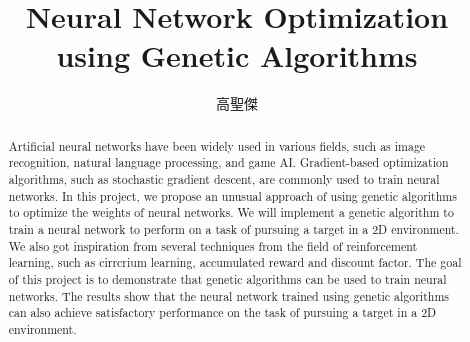 \documentclass[sigconf]{acmart}
\begin{document}
\title{Neural Network Optimization using Genetic Algorithms}

\begin{CJK}{UTF8}{bkai}
  \author{高聖傑}

\renewcommand{\shortauthors}{Kao, Sheng-Jie}

\begin{abstract}
Artificial neural networks have been widely used in various fields, such as image recognition, natural language processing, and game AI. Gradient-based optimization algorithms, such as stochastic gradient descent, are commonly used to train neural networks. In this project, we propose an unusual approach of using genetic algorithms to optimize the weights of neural networks. We will implement a genetic algorithm to train a neural network to perform on a task of pursuing a target in a 2D environment. We also got inspiration from several techniques from the field of reinforcement learning, such as cirrcrium learning, accumulated reward and discount factor. The goal of this project is to demonstrate that genetic algorithms can be used to train neural networks. The results show that the neural network trained using genetic algorithms can also achieve satisfactory performance on the task of pursuing a target in a 2D environment. 
\end{abstract}

\maketitle
\end{CJK}
\end{document}
